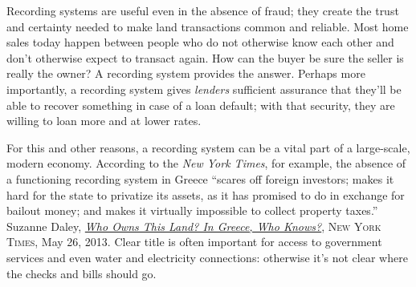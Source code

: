 Recording systems are useful even in the absence of fraud; they create the trust
and certainty needed to make land transactions common and reliable. Most home
sales today happen between people who do not otherwise know each other and
don't otherwise expect to transact again. How can the buyer be sure the seller
is really the owner? A recording system provides the answer. Perhaps more
importantly, a recording system gives \textit{lenders} sufficient assurance
that they'll be able to recover something in case of a loan default; with that
security, they are willing to loan more and at lower rates. 

For this and other reasons, a recording system can be a vital part of a
large-scale, modern economy. According to the \textit{New York Times}, for
example, the absence of a functioning recording system in Greece ``scares off
foreign investors; makes it hard for the state to privatize its assets, as it
has promised to do in exchange for bailout money; and makes it virtually
impossible to collect property taxes.'' Suzanne Daley,
\href{https://www.nytimes.com/2013/05/27/world/europe/greeces-tangled-land-ownership-is-a-hurdle-in-recovery.html?pagewanted=all}{\textit{Who
Owns This Land? In Greece, Who Knows?}}, \textsc{New York Times}, May 26, 2013.
Clear title is often important for access to government services and even water
and electricity connections: otherwise it's not clear where the checks and
bills should go.

%
%
%
